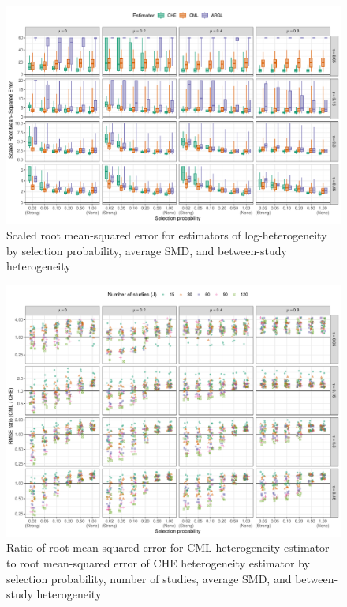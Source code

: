 \documentclass[
  american,
  man, donotrepeattitle,floatsintext]{apa7}
\begin{document}
\begin{figure}
\includegraphics{step-function-selection-models-with-dependent-effects_files/figure-latex/heterogeneity-rmse-1} \caption{Scaled root mean-squared error for estimators of log-heterogeneity by selection probability, average SMD, and between-study heterogeneity}\label{fig:heterogeneity-rmse}
\end{figure}

\begin{figure}
\includegraphics{step-function-selection-models-with-dependent-effects_files/figure-latex/heterogeneity-rmse-CML-CHE-1} \caption{Ratio of root mean-squared error for CML heterogeneity estimator to root mean-squared error of CHE heterogeneity estimator by selection probability, number of studies, average SMD, and between-study heterogeneity}\label{fig:heterogeneity-rmse-CML-CHE}
\end{figure}
\end{document}
